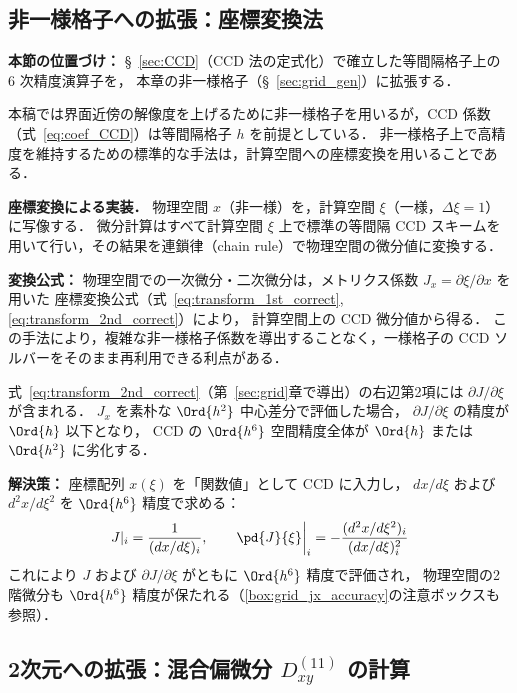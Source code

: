 %
%
\subsection{非一様格子への拡張：座標変換法}
\label{sec:ccd_metric}

\noindent\textbf{本節の位置づけ：}
§~\ref{sec:CCD}（CCD 法の定式化）で確立した等間隔格子上の 6 次精度演算子を，
本章の非一様格子（§~\ref{sec:grid_gen}）に拡張する．

本稿では界面近傍の解像度を上げるために非一様格子を用いるが，CCD 係数（式~\eqref{eq:coef_CCD}）は等間隔格子 $h$ を前提としている．
非一様格子上で高精度を維持するための標準的な手法は，計算空間への座標変換を用いることである．

\noindent\textbf{座標変換による実装．}
物理空間 $x$（非一様）を，計算空間 $\xi$（一様，$\Delta\xi=1$）に写像する．
微分計算はすべて計算空間 $\xi$ 上で標準の等間隔 CCD スキームを用いて行い，その結果を連鎖律（chain rule）で物理空間の微分値に変換する．

\textbf{変換公式：}
物理空間での一次微分・二次微分は，メトリクス係数 $J_x = \partial \xi / \partial x$ を用いた
座標変換公式（式~\eqref{eq:transform_1st_correct}, \eqref{eq:transform_2nd_correct}）により，
計算空間上の CCD 微分値から得る．
この手法により，複雑な非一様格子係数を導出することなく，一様格子の CCD ソルバーをそのまま再利用できる利点がある．

\medskip

\begin{tcolorbox}[warnbox, title={$\partial J/\partial\xi$ の精度：全体精度への影響}]
式~\eqref{eq:transform_2nd_correct}（第~\ref{sec:grid}章で導出）の右辺第2項には $\partial J/\partial\xi$ が含まれる．
$J_x$ を素朴な $\Ord{h^2}$ 中心差分で評価した場合，
$\partial J/\partial\xi$ の精度が $\Ord{h}$ 以下となり，
CCD の $\Ord{h^6}$ 空間精度全体が $\Ord{h}$ または $\Ord{h^2}$ に劣化する．

\textbf{解決策：} 座標配列 $x(\xi)$ を「関数値」として CCD に入力し，
$dx/d\xi$ および $d^2x/d\xi^2$ を $\Ord{h^6}$ 精度で求める：
\[
  J|_i = \frac{1}{(dx/d\xi)_i}, \qquad
  \pd{J}{\xi}\bigg|_i = -\frac{(d^2x/d\xi^2)_i}{(dx/d\xi)_i^2}
\]
これにより $J$ および $\partial J/\partial\xi$ がともに $\Ord{h^6}$ 精度で評価され，
物理空間の2階微分も $\Ord{h^6}$ 精度が保たれる（\ref{box:grid_jx_accuracy}の注意ボックスも参照）．
\end{tcolorbox}

\subsection{2次元への拡張：混合偏微分 \texorpdfstring{$D_{xy}^{(11)}$}{Dxy\^{}(11)} の計算}
\label{sec:ccd_mixed}

